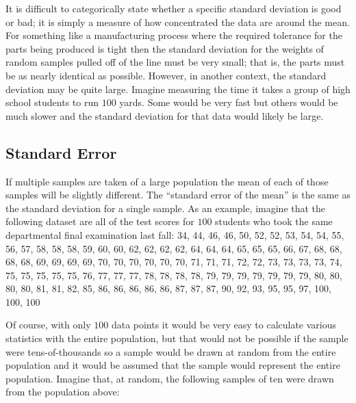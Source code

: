 It is difficult to categorically state whether a specific standard deviation is good or bad; it is simply a measure of how concentrated the data are around the mean. For something like a manufacturing process where the required tolerance for the parts being produced is tight then the standard deviation for the weights of random samples pulled off of the line must be very small; that is, the parts must be as nearly identical as possible. However, in another context, the standard deviation may be quite large. Imagine measuring the time it takes a group of high school students to run $ 100 $ yards. Some would be very fast but others would be much slower and the standard deviation for that data would likely be large. 

\subsection{Standard Error}\label{lab03_standard_error}

If multiple samples are taken of a large population the mean of each of those samples will be slightly different. The ``standard error of the mean'' is the same as the standard deviation for a single sample. As an example, imagine that the following dataset are all of the test scores for $ 100 $ students who took the same departmental final examination last fall: 34, 44, 46, 46, 50, 52, 52, 53, 54, 54, 55, 56, 57, 58, 58, 58, 59, 60, 60, 62, 62, 62, 62, 64, 64, 64, 65, 65, 65, 66, 67, 68, 68, 68, 68, 69, 69, 69, 69, 70, 70, 70, 70, 70, 70, 71, 71, 71, 72, 72, 73, 73, 73, 73, 74, 75, 75, 75, 75, 75, 76, 77, 77, 77, 78, 78, 78, 78, 79, 79, 79, 79, 79, 79, 79, 80, 80, 80, 80, 81, 81, 82, 85, 86, 86, 86, 86, 86, 87, 87, 87, 90, 92, 93, 95, 95, 97, 100, 100, 100

Of course, with only $ 100 $ data points it would be very easy to calculate various statistics with the entire population, but that would not be possible if the sample were tens-of-thousands so a sample would be drawn at random from the entire population and it would be assumed that the sample would represent the entire population. Imagine that, at random, the following samples of ten were drawn from the population above:

